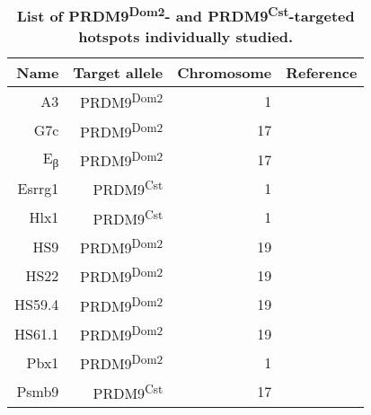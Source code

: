 \begin{table}[h]
    \centering
	\begin{adjustbox}{width = 1\textwidth}
    \begin{tabular}{rrrr}
        \toprule
        \textbf{Name} & \textbf{Target allele} & \textbf{Chromosome} & \textbf{Reference} \\


        \midrule
        A3 & PRDM9\textsuperscript{Dom2} & 1 & \citet{kelmenson2005torrid, cole2010comprehensive} \\
        G7c & PRDM9\textsuperscript{Dom2} & 17 & \citet{snoek1998molecular} \\
        E\textsubscript{\textgreek{β}} & PRDM9\textsuperscript{Dom2} & 17 & \citet{steinmetz1982molecular} \\ %
        Esrrg1 & PRDM9\textsuperscript{Cst} & 1 & \citet{billings2013dna} \\
        Hlx1 & PRDM9\textsuperscript{Cst} & 1 & \citet{ng2008quantitative,billings2013dna} \\
        HS9 & PRDM9\textsuperscript{Dom2} & 19 & \citet{bois2007highly,getun2010nucleosome} \\%
        HS22 & PRDM9\textsuperscript{Dom2} & 19 & \citet{getun2010nucleosome} \\
        HS59.4 & PRDM9\textsuperscript{Dom2} & 19 & \citet{getun2010nucleosome} \\
        HS61.1 & PRDM9\textsuperscript{Dom2} & 19 & \citet{wu2010anatomy,getun2010nucleosome} \\
        Pbx1 & PRDM9\textsuperscript{Dom2} & 1 & \citet{billings2013dna,baker2015multimer} \\
        Psmb9 & PRDM9\textsuperscript{Cst} & 17 & \citet{guillon2002initiation,baudat2007cis} \\
        \bottomrule
    \end{tabular}
	\end{adjustbox}
    \caption[List of PRDM9\textsuperscript{Dom2}- and PRDM9\textsuperscript{Cst}-targeted hotspots individually studied]
    {\textbf{List of PRDM9\textsuperscript{Dom2}- and PRDM9\textsuperscript{Cst}-targeted hotspots individually studied.}
    }
\label{tab:hotspots-studied-sperm-typing}
\end{table}


